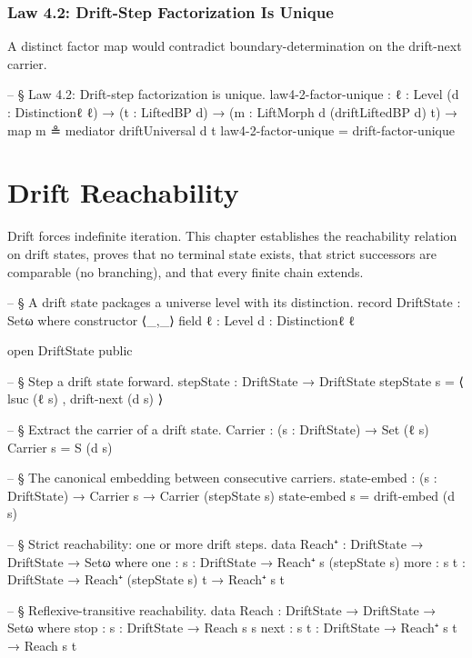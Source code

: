 \documentclass[11pt,a4paper]{book}
\begin{document}
\subsection{Law 4.2: Drift-Step Factorization Is Unique}

A distinct factor map would contradict boundary-determination on the drift-next carrier.

\begin{code}
-- § Law 4.2: Drift-step factorization is unique.
law4-2-factor-unique :
  {ℓ : Level} (d : Distinctionℓ ℓ) → (t : LiftedBP d) →
  (m : LiftMorph d (driftLiftedBP d) t) →
  map m ≗ mediator driftUniversal d t
law4-2-factor-unique = drift-factor-unique
\end{code}

\chapter{Drift Reachability}

Drift forces indefinite iteration. This chapter establishes the reachability relation on drift states, proves that no terminal state exists, that strict successors are comparable (no branching), and that every finite chain extends.

\begin{code}
-- § A drift state packages a universe level with its distinction.
record DriftState : Setω where
  constructor ⟨_,_⟩
  field
    ℓ : Level
    d : Distinctionℓ ℓ

open DriftState public

-- § Step a drift state forward.
stepState : DriftState → DriftState
stepState s = ⟨ lsuc (ℓ s) , drift-next (d s) ⟩

-- § Extract the carrier of a drift state.
Carrier : (s : DriftState) → Set (ℓ s)
Carrier s = S (d s)

-- § The canonical embedding between consecutive carriers.
state-embed : (s : DriftState) → Carrier s → Carrier (stepState s)
state-embed s = drift-embed (d s)

-- § Strict reachability: one or more drift steps.
data Reach⁺ : DriftState → DriftState → Setω where
  one  : {s : DriftState} → Reach⁺ s (stepState s)
  more : {s t : DriftState} → Reach⁺ (stepState s) t → Reach⁺ s t

-- § Reflexive-transitive reachability.
data Reach : DriftState → DriftState → Setω where
  stop : {s : DriftState} → Reach s s
  next : {s t : DriftState} → Reach⁺ s t → Reach s t
\end{code}
\end{document}
